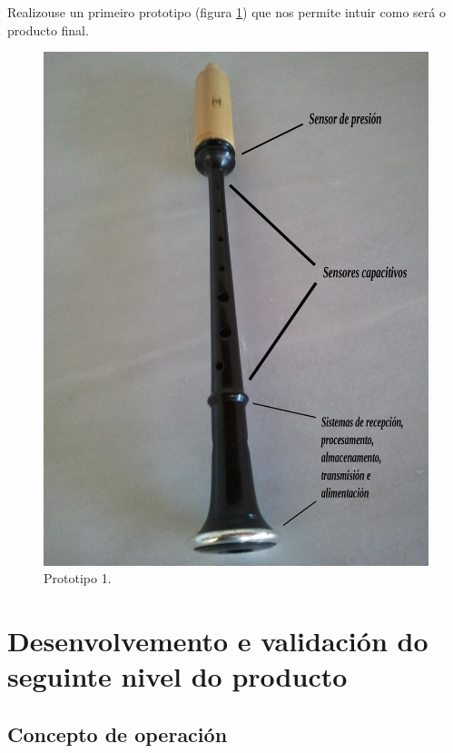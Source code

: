 Realizouse un primeiro prototipo (figura \ref{figura:Prototipo1}) que nos
 permite intuir como será o producto final.

 \begin{figure}[htbp]
  \centering
  \includegraphics[scale=0.15,keepaspectratio=true]{./imagenes/prototipo1.png}
  \caption{Prototipo 1.}
  \label{figura:Prototipo1}
 \end{figure}

\section{Desenvolvemento e validación do seguinte nivel do producto}

 \subsection{Concepto de operación}

